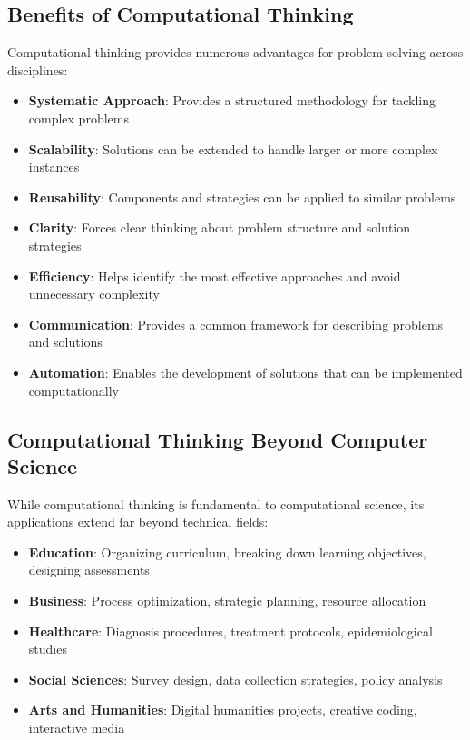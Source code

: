 \subsection{Benefits of Computational Thinking}

Computational thinking provides numerous advantages for problem-solving across disciplines:

\begin{itemize}
  \item \textbf{Systematic Approach}: Provides a structured methodology for tackling complex problems
  \item \textbf{Scalability}: Solutions can be extended to handle larger or more complex instances
  \item \textbf{Reusability}: Components and strategies can be applied to similar problems
  \item \textbf{Clarity}: Forces clear thinking about problem structure and solution strategies
  \item \textbf{Efficiency}: Helps identify the most effective approaches and avoid unnecessary complexity
  \item \textbf{Communication}: Provides a common framework for describing problems and solutions
  \item \textbf{Automation}: Enables the development of solutions that can be implemented computationally
\end{itemize}

\subsection{Computational Thinking Beyond Computer Science}

While computational thinking is fundamental to computational science, its applications extend far beyond technical fields:

\begin{itemize}
  \item \textbf{Education}: Organizing curriculum, breaking down learning objectives, designing assessments
  \item \textbf{Business}: Process optimization, strategic planning, resource allocation
  \item \textbf{Healthcare}: Diagnosis procedures, treatment protocols, epidemiological studies
  \item \textbf{Social Sciences}: Survey design, data collection strategies, policy analysis
  \item \textbf{Arts and Humanities}: Digital humanities projects, creative coding, interactive media
\end{itemize}

